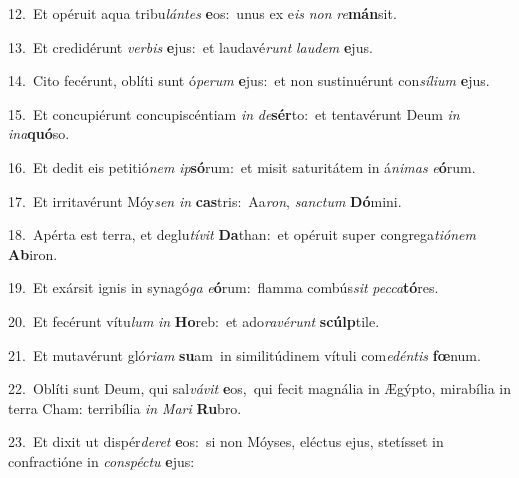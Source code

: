 {\numbfont\textcolor{\numbcolor}{12.}}~Et opéruit aqua tribu\-\textit{lán}\-\textit{tes} \textbf{e}\-os:~\star unus ex e\textit{is} \textit{non} \textit{re}\-\textbf{mán}sit.\par
{\numbfont\textcolor{\numbcolor}{13.}}~Et credidérunt \textit{ver}\-\textit{bis} \textbf{e}\-jus:~\star et laudavé\textit{runt} \textit{lau}\-\textit{dem} \textbf{e}\-jus.\par
{\numbfont\textcolor{\numbcolor}{14.}}~Cito fecérunt, oblíti sunt ó\-\textit{pe}\-\textit{rum} \textbf{e}\-jus:~\star et non sustinuérunt con\-\textit{sí}\-\textit{li}\textit{um} \textbf{e}\-jus.\par
{\numbfont\textcolor{\numbcolor}{15.}}~Et concupiérunt concupiscéntiam \textit{in} \textit{de}\-\textbf{sér}to:~\star et tentavérunt Deum \textit{in} \textit{in}\-\textit{a}\textbf{quó}so.\par
{\numbfont\textcolor{\numbcolor}{16.}}~Et dedit eis petitió\textit{nem} \textit{ip}\-\textbf{só}rum:~\star et misit saturitátem in á\-\textit{ni}\-\textit{mas} \textit{e}\-\textbf{ó}rum.\par
{\numbfont\textcolor{\numbcolor}{17.}}~Et irritavérunt Móy\textit{sen} \textit{in} \textbf{cas}\-tris:~\star Aa\-\textit{ron}\-, \textit{sanc}\-\textit{tum} \textbf{Dó}\-mini.\par
{\numbfont\textcolor{\numbcolor}{18.}}~Apérta est terra, et deglu\-\textit{tí}\-\textit{vit} \textbf{Da}\-than:~\star et opéruit super congrega\-\textit{ti}\-\textit{ó}\textit{nem} \textbf{Ab}\-iron.\par
{\numbfont\textcolor{\numbcolor}{19.}}~Et exársit ignis in synagó\textit{ga} \textit{e}\-\textbf{ó}rum:~\star flamma combús\textit{sit} \textit{pec}\-\textit{ca}\textbf{tó}res.\par
{\numbfont\textcolor{\numbcolor}{20.}}~Et fecérunt vítu\textit{lum} \textit{in} \textbf{Ho}\-reb:~\star et ado\-\textit{ra}\-\textit{vé}\textit{runt} \textbf{scúlp}\-tile.\par
{\numbfont\textcolor{\numbcolor}{21.}}~Et mutavérunt gló\-\textit{ri}\-\textit{am} \textbf{su}\-am~\star in similitúdinem vítuli com\-\textit{e}\-\textit{dén}\textit{tis} \textbf{fœ}\-num.\par
{\numbfont\textcolor{\numbcolor}{22.}}~Oblíti sunt Deum, qui sal\-\textit{vá}\-\textit{vit} \textbf{e}\-os,~\star qui fecit magnália in Ægýpto, mirabília in terra Cham: terribília \textit{in} \textit{Ma}\-\textit{ri} \textbf{Ru}\-bro.\par
{\numbfont\textcolor{\numbcolor}{23.}}~Et dixit ut dispér\-\textit{de}\-\textit{ret} \textbf{e}\-os:~\star si non Móyses, eléctus ejus, stetísset in confractióne in \textit{con}\-\textit{spéc}\textit{tu} \textbf{e}\-jus:\par
